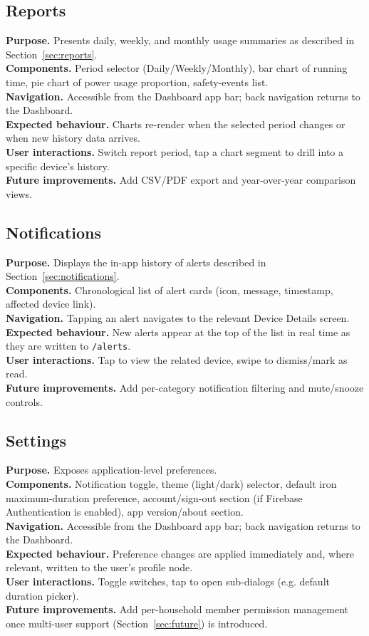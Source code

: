 \documentclass[11pt,a4paper]{article}
\begin{document}
\subsection{Reports}
\textbf{Purpose.} Presents daily, weekly, and monthly usage summaries as described in Section~\ref{sec:reports}.\\
\textbf{Components.} Period selector (Daily/Weekly/Monthly), bar chart of running time, pie chart of power usage proportion, safety-events list.\\
\textbf{Navigation.} Accessible from the Dashboard app bar; back navigation returns to the Dashboard.\\
\textbf{Expected behaviour.} Charts re-render when the selected period changes or when new history data arrives.\\
\textbf{User interactions.} Switch report period, tap a chart segment to drill into a specific device's history.\\
\textbf{Future improvements.} Add CSV/PDF export and year-over-year comparison views.

\subsection{Notifications}
\textbf{Purpose.} Displays the in-app history of alerts described in Section~\ref{sec:notifications}.\\
\textbf{Components.} Chronological list of alert cards (icon, message, timestamp, affected device link).\\
\textbf{Navigation.} Tapping an alert navigates to the relevant Device Details screen.\\
\textbf{Expected behaviour.} New alerts appear at the top of the list in real time as they are written to \texttt{/alerts}.\\
\textbf{User interactions.} Tap to view the related device, swipe to dismiss/mark as read.\\
\textbf{Future improvements.} Add per-category notification filtering and mute/snooze controls.

\subsection{Settings}
\textbf{Purpose.} Exposes application-level preferences.\\
\textbf{Components.} Notification toggle, theme (light/dark) selector, default iron maximum-duration preference, account/sign-out section (if Firebase Authentication is enabled), app version/about section.\\
\textbf{Navigation.} Accessible from the Dashboard app bar; back navigation returns to the Dashboard.\\
\textbf{Expected behaviour.} Preference changes are applied immediately and, where relevant, written to the user's profile node.\\
\textbf{User interactions.} Toggle switches, tap to open sub-dialogs (e.g. default duration picker).\\
\textbf{Future improvements.} Add per-household member permission management once multi-user support (Section~\ref{sec:future}) is introduced.
\end{document}
